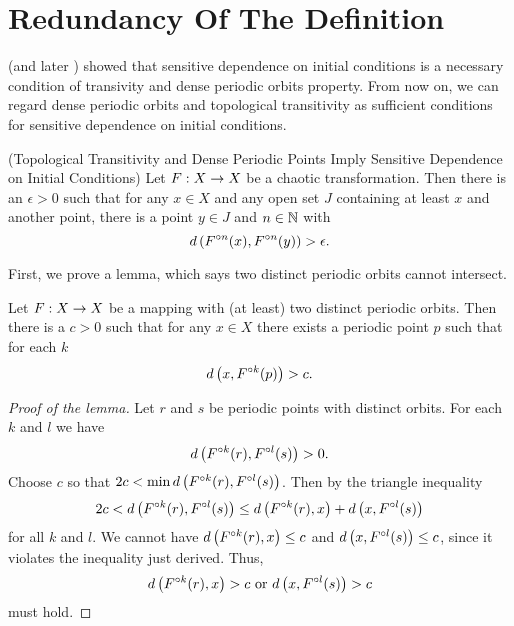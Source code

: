 \documentclass[12pt,draft,twoside]{book}
\begin{document}
\section{Redundancy Of The Definition}
\citet{silverman} (and later \citet{banks}) showed that sensitive dependence on initial conditions is a necessary condition of transivity and dense periodic orbits property.
From now on, we can regard dense periodic orbits and topological transitivity as sufficient conditions for sensitive dependence on initial conditions.

\begin{theorem}
  (Topological Transitivity and Dense Periodic Points Imply Sensitive Dependence on Initial Conditions)
  Let $F: X\rightarrow X$ be a chaotic transformation. Then there is an $\epsilon > 0$ such that
  for any $x\in X$ and any open set $J$ containing at least $x$ and another point, there is
  a point $y\in J$ and $n\in \mathbb{N}$ with
  \begin{equation*}
    d\left( F^{\circ n}(x),F^{\circ n}(y) \right) > \epsilon.
  \end{equation*}
  \label{thm:silverman}
\end{theorem}
First, we prove a lemma, which says two distinct periodic orbits cannot intersect.
\begin{lemma}
  Let $F: X\rightarrow X$ be a mapping with (at least) two distinct periodic orbits.
  Then there is a $c > 0$ such that for any $x\in X$ there exists a periodic
  point $p$ such that for each $k$
  \begin{equation*}
    d\left( x, F^{\circ k}(p) \right) > c.
  \end{equation*}
  \label{lem:dev1}
  \begin{proof}[Proof of the lemma]
    Let $r$ and $s$ be periodic points with distinct orbits. For each $k$ and $l$ we have
    \begin{equation*}
      d\left( F^{\circ k}(r), F^{\circ l}(s) \right) > 0.
    \end{equation*}
    Choose $c$ so that $2c < \min d\left( F^{\circ k}(r),F^{\circ l}(s) \right)$.
    Then by the triangle inequality
    \begin{equation*}
      2c < d\left( F^{\circ k}(r),F^{\circ l}(s) \right) \leq d\left( F^{\circ k}(r),x \right) + d\left( x,F^{\circ l}(s) \right)
    \end{equation*}
    for all $k$ and $l$.
    We cannot have $d\left( F^{\circ k}(r),x \right) \leq c$ and $d\left( x,F^{\circ l}(s) \right) \leq c$, since it violates the inequality just derived.
    Thus,
    \begin{equation*}
      d\left( F^{\circ k}(r),x \right) > c \mbox{ or } d\left( x,F^{\circ l}(s) \right) > c
    \end{equation*}
    must hold.
  \end{proof}
\end{lemma}
\end{document}
